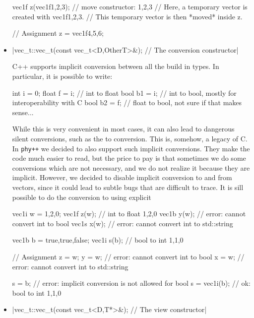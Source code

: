 \documentclass[12pt]{report}
\newcommand{\phypp}{\texttt{phy++}\xspace}
\newenvironment{example}
{
    \begin{mdframed}[style=example,frametitle={Example}]
}
{
    \end{mdframed}
}
\begin{document}
\begin{itemize}
\begin{example}
\begin{cppcode}
vec1f z(vec1f{1,2,3}); // move constructor: {1,2,3}
// Here, a temporary vector is created with vec1f{1,2,3}.
// This temporary vector is then *moved* inside z.

// Assignment
z = vec1f{4,5,6};
\end{cppcode}
\end{example}

\item \cppinline|vec_t::vec_t(const vec_t<D,OtherT>&); // The conversion constructor|

C++ supports implicit conversion between all the build in types. In particular, it is possible to write:
\begin{cppcode}
int i = 0;
float f = i; // int to float
bool b1 = i; // int to bool, mostly for interoperability with C
bool b2 = f; // float to bool, not sure if that makes sense...
\end{cppcode}
While this is very convenient in most cases, it can also lead to dangerous silent conversions, such as the  to  conversion. This is, somehow, a legacy of C. In \phypp we decided to also support such implicit conversions. They make the code much easier to read, but the price to pay is that sometimes we do some conversions which are not necessary, and we do not realize it because they are implicit. However, we decided to disable implicit conversion to and from  vectors, since it could lead to subtle bugs that are difficult to trace. It is sill possible to do the conversion to  using explicit

\begin{example}
\begin{cppcode}
vec1i w = {1,2,0};
vec1f z(w); // int to float {1,2,0}
vec1b y(w); // error: cannot convert int to bool
vec1s x(w); // error: cannot convert int to std::string

vec1b b = {true,true,false};
vec1i s(b); // bool to int {1,1,0}

// Assignment
z = w;
y = w;        // error: cannot convert int to bool
x = w;        // error: cannot convert int to std::string

s = b;        // error: implicit conversion is not allowed for bool
s = vec1i(b); // ok: bool to int {1,1,0}
\end{cppcode}
\end{example}

\item \cppinline|vec_t::vec_t(const vec_t<D,T*>&); // The view constructor|


\end{itemize}
\end{document}
